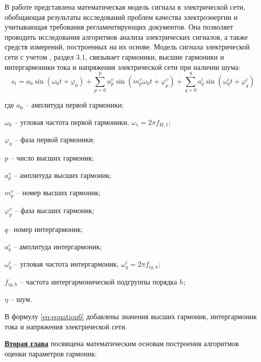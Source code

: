 В работе представлена математическая модель сигнала в электрической сети, обобщающая результаты исследований проблем качества электроэнергии и учитывающая требования регламентирующих документов. Она позволяет проводить исследования алгоритмов анализа электрических сигналов, а также средств измерений, построенных на их основе.
Модель сигнала электрической сети с учетом \cite{GOST30804.4.7-2013}, раздел $3.1$, связывает гармоники, высшие гармоники и интергармоники тока и напряжения электрической сети при наличии шума: 
\begin{equation}
	\label{eq:equation6}
	s_{t} = a_{0} \sin (\omega_{0} t + \varphi_{0}) + \displaystyle\sum_{p=0}^{p} a_p^{\upsilon} \sin (m_p^{\upsilon} \omega_{0} t + \varphi_p^{\upsilon}) + \displaystyle\sum_{q=0}^{q} a_q^i \sin  (\omega_q^i t + \varphi_q^{i})
\end{equation}

где $a_{0}$ – амплитуда первой гармоники;

$\omega_{0}$ – угловая частота первой гармоники, $\omega_{1} = 2 \pi f_{H,1}$;

$\varphi_{0}$ – фаза первой гармоники; 

$p$ – число высших гармоник;

$a_p^{\upsilon}$ – амплитуда высших гармоник;

$m_p^{\upsilon}$ – номер высших гармоник;

$\varphi_p^{\upsilon}$ – фаза высших гармоник;

$q$– номер интергармоник;

$a_q^i$ – амплитуда интергармоник;

$\omega_q^i$ – угловая частота интергармоник, $\omega_q^i=2\pi f_{ig,h}$; 

$f_{ig,h}$ – частота интергармонической подгруппы порядка $h$;

$\eta$ – шум.

В формулу \ref{eq:equation6} добавлены значения высших гармоник, интергармоник тока и напряжения электрической сети.


\underline{\textbf{Вторая глава}} посвящена математическим основам построения алгоритмов оценки параметров гармоник:

